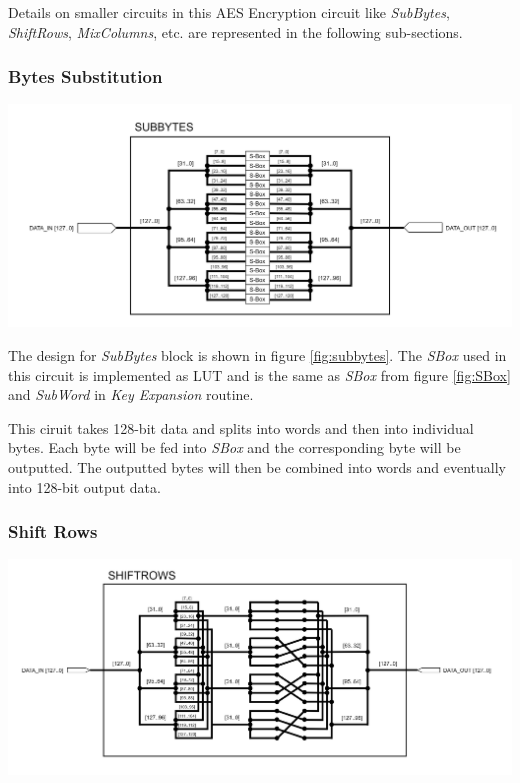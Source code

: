 \documentclass[a4paper, 10pt]{article}
\newenvironment{Figure}
    {\par\medskip\noindent\minipage{\linewidth}}
    {\endminipage\par\medskip}
\begin{document}
\begin{multicols}{2}
	Details on smaller circuits in this AES Encryption circuit like \textit{SubBytes}, \textit{ShiftRows}, \textit{MixColumns}, etc. are represented in the following sub-sections.

            \subsubsection{Bytes Substitution}

            \noindent
            \begin{Figure}
                \centering
                \includegraphics[width=\linewidth]{SubBytes.png}
                \label{fig:subbytes}
            \end{Figure}

            The design for \textit{SubBytes} block is shown in figure \ref{fig:subbytes}. The \textit{SBox} used in this circuit is implemented as LUT and is the same as \textit{SBox} from figure \ref{fig:SBox} and \textit{SubWord} in \textit{Key Expansion} routine.

            This ciruit takes 128-bit data and splits into words and then into individual bytes. Each byte will be fed into \textit{SBox} and the corresponding byte will be outputted. The outputted bytes will then be combined into words and eventually into 128-bit output data.

            \subsubsection{Shift Rows}

	\noindent
            \begin{Figure}
                \centering
                \includegraphics[width=\linewidth]{ShiftRows.png}
                \label{fig:shiftrows}
            \end{Figure}


\end{multicols}
\end{document}
